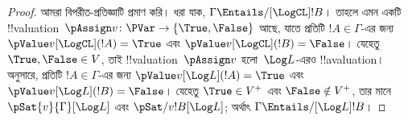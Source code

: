 \documentclass[../../../include/open-logic-section]{subfiles}
\begin{document}
\begin{proof}
  আমরা বিপরীত-প্রতিজ্ঞাটি প্রমাণ করি। ধরা যাক, $\Gamma
  \Entails/[\LogCL] !B$। তাহলে এমন একটি
  !!{valuation}~$\pAssign v\colon \PVar \to
  \{\True, \False\}$ আছে, যাতে প্রতিটি $!A \in \Gamma$-এর জন্য
  $\pValue v[\LogCL](!A) = \True$ এবং $\pValue v[\LogCL](!B) =
  \False$। যেহেতু $\True,
  \False \in V$, তাই !!{valuation}~$\pAssign v$ হলো~$\Log L$-এরও
  !!a{valuation}।  অনুসারে, প্রতিটি
  $!A \in \Gamma$-এর জন্য $\pValue v[\Log L](!A) =
  \True$ এবং $\pValue v[\Log L](!B) = \False$। যেহেতু $\True \in V^+$
  এবং $\False \notin V^+$, তার মানে $\pSat{v}{\Gamma}[\Log L]$ এবং
  $\pSat/{v}{!B}[\Log L]$; অর্থাৎ $\Gamma \Entails/[\Log L] !B$।
\end{proof}
\end{document}
